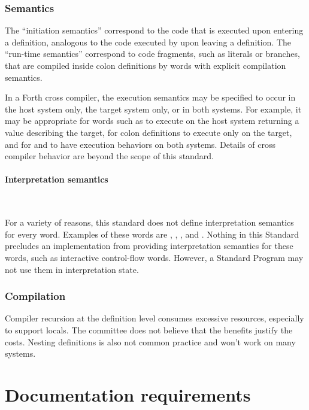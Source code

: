 \setcounter{subsubsection}{2}
\subsubsection{Semantics} %

The ``initiation semantics'' correspond to the code that is executed
upon entering a definition, analogous to the code executed by
 upon leaving a definition. The ``run-time semantics''
correspond to code fragments, such as literals or branches, that are
compiled inside colon definitions by words with explicit compilation
semantics.

In a Forth cross compiler, the execution semantics may be specified
to occur in the host system only, the target system only, or in both
systems. For example, it may be appropriate for words such as
 to execute on the host system returning a value describing
the target, for colon definitions to execute only on the target, and
for  and  to have execution behaviors on
both systems. Details of cross compiler behavior are beyond the scope
of this standard.

\setcounter{paragraph}{1}
\paragraph{Interpretation semantics} ~ %
\label{rat:interpret}

For a variety of reasons, this standard does not define interpretation
semantics for every word. Examples of these words are ,
, , and . Nothing in this Standard precludes
an implementation from providing interpretation semantics for these
words, such as interactive control-flow words. However, a Standard
Program may not use them in interpretation state.

\addtocounter{subsubsection}{1}
\subsubsection{Compilation} %

Compiler recursion at the definition level consumes excessive
resources, especially to support locals. The committee does not
believe that the benefits justify the costs. Nesting definitions
is also not common practice and won't work on many systems.

\section{Documentation requirements} %

